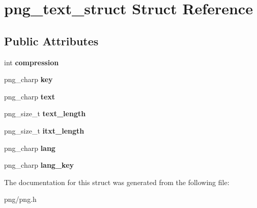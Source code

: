 \hypertarget{structpng__text__struct}{}\section{png\+\_\+text\+\_\+struct Struct Reference}
\label{structpng__text__struct}
\subsection*{Public Attributes}
\begin{DoxyCompactItemize}
\item 
int {\bfseries compression}\hypertarget{structpng__text__struct_ad09c73bc91f014ad352abfbb3b61b8d1}{}\label{structpng__text__struct_ad09c73bc91f014ad352abfbb3b61b8d1}

\item 
png\+\_\+charp {\bfseries key}\hypertarget{structpng__text__struct_a99c3063a15889d2fc242f24b69c567ef}{}\label{structpng__text__struct_a99c3063a15889d2fc242f24b69c567ef}

\item 
png\+\_\+charp {\bfseries text}\hypertarget{structpng__text__struct_a27492227bc525bee14abcc8002084edd}{}\label{structpng__text__struct_a27492227bc525bee14abcc8002084edd}

\item 
png\+\_\+size\+\_\+t {\bfseries text\+\_\+length}\hypertarget{structpng__text__struct_a26312284ecc7a95e2168a29d0170b411}{}\label{structpng__text__struct_a26312284ecc7a95e2168a29d0170b411}

\item 
png\+\_\+size\+\_\+t {\bfseries itxt\+\_\+length}\hypertarget{structpng__text__struct_aca3fd6fec58f54460d57ad07182d570d}{}\label{structpng__text__struct_aca3fd6fec58f54460d57ad07182d570d}

\item 
png\+\_\+charp {\bfseries lang}\hypertarget{structpng__text__struct_a803048cbecc84ca530d64db6513f4fc6}{}\label{structpng__text__struct_a803048cbecc84ca530d64db6513f4fc6}

\item 
png\+\_\+charp {\bfseries lang\+\_\+key}\hypertarget{structpng__text__struct_a61ee3cba011cf3bdefda49f8f9885482}{}\label{structpng__text__struct_a61ee3cba011cf3bdefda49f8f9885482}

\end{DoxyCompactItemize}


The documentation for this struct was generated from the following file\+:\begin{DoxyCompactItemize}
\item 
png/png.\+h\end{DoxyCompactItemize}
